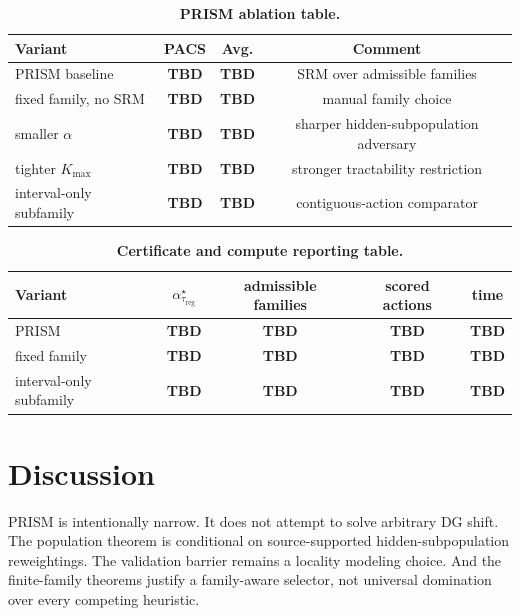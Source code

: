 \documentclass{article}
\newcommand{\TBD}{\textbf{TBD}}
\newcommand{\prism}{\textup{\textsc{PRISM}}}
\newcommand{\1}{\mathbbm{1}}
\begin{document}
\begin{table}[t]
    \centering
    \small
    \caption{\textbf{\prism{} ablation table.}}
    \label{tab:ablation_tbd}
    \setlength{\tabcolsep}{8pt}
    \begin{tabular}{lccc}
        \toprule
        Variant & PACS & Avg. & Comment \\
        \midrule
        \prism{} baseline & \TBD & \TBD & SRM over admissible families \\
        fixed family, no SRM & \TBD & \TBD & manual family choice \\
        smaller \(\alpha\) & \TBD & \TBD & sharper hidden-subpopulation adversary \\
        tighter \(K_{\max}\) & \TBD & \TBD & stronger tractability restriction \\
        interval-only subfamily & \TBD & \TBD & contiguous-action comparator \\
        \bottomrule
    \end{tabular}
\end{table}

\begin{table}[t]
    \centering
    \small
    \caption{\textbf{Certificate and compute reporting table.}}
    \label{tab:certificate_tbd}
    \setlength{\tabcolsep}{8pt}
    \begin{tabular}{lcccc}
        \toprule
        Variant & \(\alpha^\star_{\tau_{\mathrm{reg}}}\) & admissible families & scored actions & time \\
        \midrule
        \prism{} & \TBD & \TBD & \TBD & \TBD \\
        fixed family & \TBD & \TBD & \TBD & \TBD \\
        interval-only subfamily & \TBD & \TBD & \TBD & \TBD \\
        \bottomrule
    \end{tabular}
\end{table}

\section{Discussion}

\prism{} is intentionally narrow. It does not attempt to solve arbitrary DG shift. The population theorem is conditional on source-supported hidden-subpopulation reweightings. The validation barrier remains a locality modeling choice. And the finite-family theorems justify a family-aware selector, not universal domination over every competing heuristic.
\end{document}
